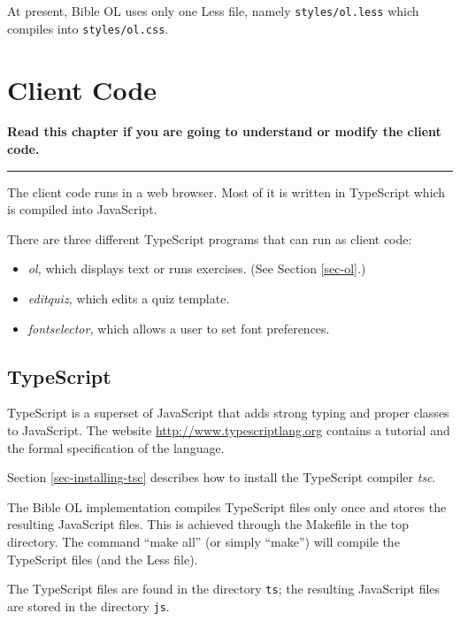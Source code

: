 \documentclass[11pt,oneside,a4paper]{memoir}
\begin{document}
At present, Bible OL uses only one Less file, namely \texttt{styles/ol.less} which compiles into
\texttt{styles/ol.css}.

\chapter{Client Code}\label{chap-client-code}

\textbf{Read this chapter if you are going to understand or modify the client code.}
\plainbreak{3}

The client code runs in a web browser. Most of it is written in TypeScript which is compiled into
JavaScript.

There are three different TypeScript programs that can run as client code:


\begin{itemize}
\item \emph{ol,} which displays text or runs exercises. (See Section \ref{sec-ol}.)
\item \emph{editquiz,} which edits a quiz template.
\item \emph{fontselector,} which allows a user to set font preferences.
\end{itemize}

\section{TypeScript}\label{sec-typescript-use}

TypeScript is a superset of JavaScript that adds strong typing and proper classes to JavaScript.
The website \url{http://www.typescriptlang.org} contains a tutorial and the formal specification of
the language.

Section \ref{sec-installing-tsc} describes how to install the TypeScript compiler \emph{tsc}.

The Bible OL implementation compiles TypeScript files only once and stores the resulting JavaScript
files. This is achieved through the Makefile in the top directory. The command ``make all'' (or
simply ``make'') will compile the TypeScript files (and the Less file).

The TypeScript files are found in the directory \texttt{ts}; the resulting JavaScript files are
stored in the directory \texttt{js}.
\end{document}
